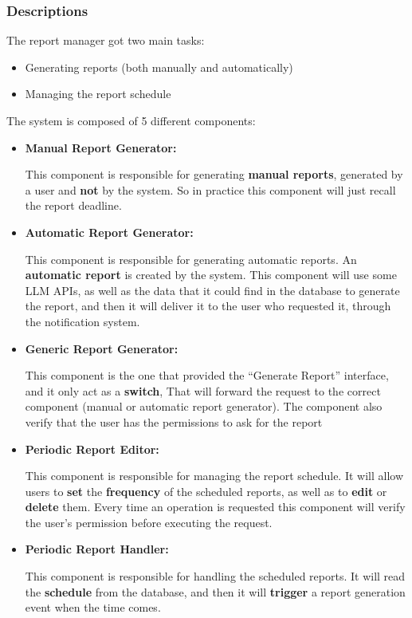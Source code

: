 \documentclass{article}
\begin{document}
\subsubsection{Descriptions}
The report manager got  two main tasks:
\begin{itemize}
    \item Generating reports (both manually and automatically) 
    \item Managing the report schedule 
\end{itemize}

The system is composed of 5 different components:

\begin{itemize}
    \item \textbf{Manual Report Generator: }

    This component is responsible for generating \textbf{manual reports}, generated by a user and \textbf{not} by the system.
    So in practice this component will just recall the report deadline.
    \item \textbf{Automatic Report Generator: }

    This component is responsible for generating automatic reports. An \textbf{automatic report} is created by the system. This component will use some LLM APIs, as well as the data that it could find in the database to generate the report, and then it will deliver it
    to the user who requested it, through the notification system.

    \item \textbf{Generic Report Generator: }
    
    This component is the one that provided the ``Generate Report'' interface, and it only act as a \textbf{switch}, That 
    will forward the request to the correct component (manual or automatic report generator).
    The component also verify that the user has the permissions to ask for the report

    \item \textbf{Periodic Report Editor: }

    This component is responsible for managing the report schedule.
    It will allow users to \textbf{set} the \textbf{frequency} of the scheduled reports, as well as to \textbf{edit} or \textbf{delete} them.
    Every time an operation is requested this component will verify the user's permission before executing the request.

    \item \textbf{Periodic Report Handler: }
    
    This component is responsible for handling the scheduled reports.
    It will read the \textbf{schedule} from the database, and then it will \textbf{trigger} a report generation event when the time comes.

\end{itemize}
\end{document}
